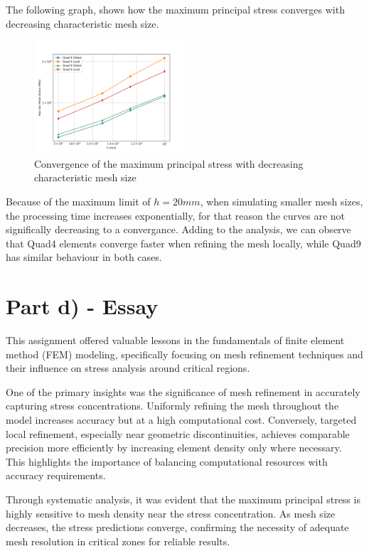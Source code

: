 The following graph, shows how the maximum principal stress converges with decreasing characteristic mesh size.

\begin{figure}[H]
    \centering
    \includegraphics[width=0.5\textwidth]{GRAFICOS/convergencia.png}
    \caption{Convergence of the maximum principal stress with decreasing characteristic mesh size}
    \label{fig:convergence}
\end{figure}

Because of the maximum limit of $h=20mm$, when simulating smaller mesh sizes, the processing time increases exponentially, for that reason the curves are not significally decreasing to a convergance. Adding to the analysis, we can observe that Quad4 elements converge faster when refining the mesh locally, while Quad9 has similar behaviour in both cases.

\section{Part d) - Essay}

This assignment offered valuable lessons in the fundamentals of finite element method (FEM) modeling, specifically focusing on mesh refinement techniques and their influence on stress analysis around critical regions.

One of the primary insights was the significance of mesh refinement in accurately capturing stress concentrations. Uniformly refining the mesh throughout the model increases accuracy but at a high computational cost. Conversely, targeted local refinement, especially near geometric discontinuities, achieves comparable precision more efficiently by increasing element density only where necessary. This highlights the importance of balancing computational resources with accuracy requirements.

Through systematic analysis, it was evident that the maximum principal stress is highly sensitive to mesh density near the stress concentration. As mesh size decreases, the stress predictions converge, confirming the necessity of adequate mesh resolution in critical zones for reliable results.

